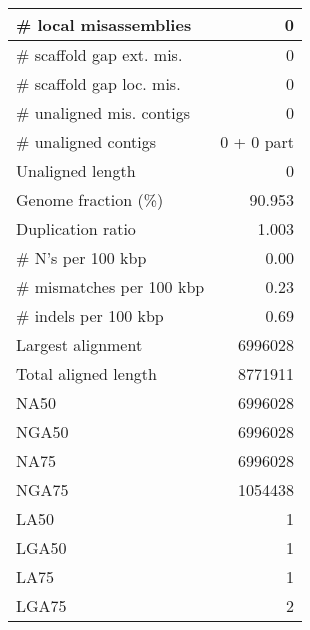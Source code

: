 \documentclass[12pt,a4paper]{article}
\begin{document}
\begin{table}[ht]
\begin{center}
\begin{tabular}{|l*{1}{|r}|}
\# local misassemblies & 0 \\ \hline
\# scaffold gap ext. mis. & 0 \\ \hline
\# scaffold gap loc. mis. & 0 \\ \hline
\# unaligned mis. contigs & 0 \\ \hline
\# unaligned contigs & 0 + 0 part \\ \hline
Unaligned length & 0 \\ \hline
Genome fraction (\%) & 90.953 \\ \hline
Duplication ratio & 1.003 \\ \hline
\# N's per 100 kbp & 0.00 \\ \hline
\# mismatches per 100 kbp & 0.23 \\ \hline
\# indels per 100 kbp & 0.69 \\ \hline
Largest alignment & 6996028 \\ \hline
Total aligned length & 8771911 \\ \hline
NA50 & 6996028 \\ \hline
NGA50 & 6996028 \\ \hline
NA75 & 6996028 \\ \hline
NGA75 & 1054438 \\ \hline
LA50 & 1 \\ \hline
LGA50 & 1 \\ \hline
LA75 & 1 \\ \hline
LGA75 & 2 \\ \hline
\end{tabular}
\end{center}
\end{table}
\end{document}
